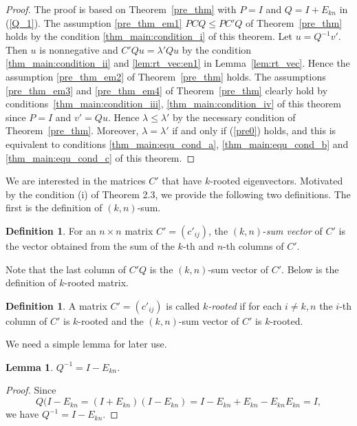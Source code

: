 \documentclass[12pt, a4paper]{article}
\theoremstyle{plain}
\newtheorem{lem}[thm]{Lemma}
\theoremstyle{definition}
\newtheorem{defn}[thm]{Definition}
\begin{document}
\begin{proof}
    The proof is based on Theorem~\ref{pre_thm} with $P = I$ and $Q = I + E_{kn}$ in (\ref{Q_1}).
    The assumption \ref{pre_thm_em1} $PCQ\leq PC'Q$ of Theorem~\ref{pre_thm} holds by the condition \ref{thm_main:condition_i} of this theorem.
    Let $u = Q^{-1}v'$. Then $u$ is nonnegative and $C'Qu = \lambda' Qu$ by the condition \ref{thm_main:condition_ii} and \ref{lem:rt_vec:en1} in
     Lemma~\ref{lem:rt_vec}. Hence the assumption \ref{pre_thm_em2} of Theorem~\ref{pre_thm} holds. The assumptions \ref{pre_thm_em3} and \ref{pre_thm_em4}
      of Theorem~\ref{pre_thm} clearly hold by conditions~\ref{thm_main:condition_iii}, \ref{thm_main:condition_iv} of this theorem since $P = I$ and
       $v'= Qu$. Hence $\lambda \leq \lambda' $ by the necessary condition of Theorem~\ref{pre_thm}. Moreover,
        $\lambda = \lambda'$ if and only if (\ref{pre0}) holds, and this is equivalent to
         conditions \ref{thm_main:equ_cond_a}, \ref{thm_main:equ_cond_b} and \ref{thm_main:equ_cond_c} of this theorem.
\end{proof}

We are interested in the matrices $C'$ that have $k$-rooted eigenvectors.
Motivated by the condition (i) of Theorem 2.3, we provide the following two definitions.
The first is the definition of $(k,n)$-sum.
\begin{defn}
    For an $n \times n$ matrix $C'=(c'_{ij})$, the $(k, n)$-{\it sum vector} of $C'$ is the vector
     obtained from the sum of the $k$-th and  $n$-th columns of $C'$.
\end{defn}

Note that the last column of $C'Q$ is the $(k, n)$-sum vector of $C'$.
Below is the definition of $k$-rooted matrix.
\begin{defn}\label{m_rooted}
    A  matrix $C'=(c'_{ij})$ is called {\it $k$-rooted}  if for
     each $i\not=k, n$ the  $i$-th column of $C'$  is $k$-rooted
     and the $(k,n)$-sum vector of $C'$ is $k$-rooted.
\end{defn}


We need a simple lemma for later use.

\begin{lem}
$Q^{-1}=I-E_{kn}.$
\end{lem}

\begin{proof}
Since $$Q(I-E_{kn}=(I+E_{kn})(I-E_{kn})=I-E_{kn}+E_{kn}-E_{kn}E_{kn}=I,$$ we have
$Q^{-1}=I-E_{kn}$.
\end{proof}
\end{document}
